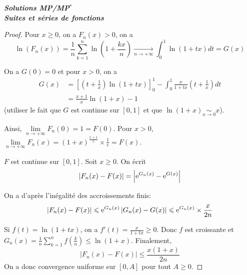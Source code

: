 \documentclass[12pt]{article}
\begin{document}
\begin{titlepage}
	\centering
	\vspace*{\fill}
	\Huge \textit{\textbf{Solutions MP/MP$^*$\\ Suites et séries de fonctions}}
	\vspace*{\fill}
\end{titlepage}

\begin{proof}
    Pour $x\geqslant0$, on a $F_{n}(x)>0$, on a 
    \begin{equation}
        \ln\left(F_{n}(x)\right)=\frac{1}{n}\sum_{k=1}^{n}\ln\left(1+\frac{kx}{n}\right)\xrightarrow[n\to+\infty]{}\int_{0}^{1}\ln\left(1+tx\right)dt=G(x)
    \end{equation}

    On a $G(0)=0$ et pour $x>0$, on a
    \begin{align}
        G(x)
        &= \left[\left(t+\frac{1}{x}\right)\ln(1+tx)\right]_{0}^{1}-\int_{0}^{1}\frac{x}{1+tx}\left(t+\frac{1}{x}\right)dt\\
        &=\frac{x+1}{x}\ln(1+x)-1
    \end{align}
    (utiliser le fait que $G$ est continue sur $[0,1]$ et que $\ln(1+x)\underset{x\to0}{\sim}x$).

    Ainsi, $\lim\limits_{n\to+\infty}F_{n}(0)=1=F(0)$.
    Pour $x>0$, $\lim\limits_{n\to+\infty}F_{n}(x)=\left(1+x\right)^{\frac{x+1}{x}}\times\frac{1}{e}=F(x)$.

    $F$ est continue sur $[0,1]$. Soit $x\geqslant0$. On écrit 
    \begin{equation}
        \left\lvert F_{n}(x)-F(x)\right\rvert=\left\lvert\mathrm{e}^{G_{n}(x)}-\mathrm{e}^{G(x)}\right\rvert
    \end{equation}

    
    On a d'après l'inégalité des accroissements finis: 
    \begin{equation}
        \left\lvert F_{n}(x)-F(x)\right\rvert\leqslant\mathrm{e}^{G_{n}(x)}\left\lvert G_{n}(x)-G(x)\right\rvert\leqslant\mathrm{e}^{G_{n}(x)}\times\frac{x}{2n}
    \end{equation}
    
    Si $f(t)=\ln\left(1+tx\right)$, on a $f'(t)=\frac{x}{1+tx}\geqslant0$. Donc $f$ est croissante et $G_{n}(x)=\frac{1}{n}\sum_{k=1}^{n}f\left(\frac{k}{n}\right)\leqslant\ln(1+x)$. Finalement, 
    \begin{equation}
        \left\lvert F_{n}(x)-F(x)\right\rvert\leqslant\frac{x(1+x)}{2n}
    \end{equation}
    On a donc convergence uniforme sur $[0,A]$ pour tout $A\geqslant0$.
\end{proof}
\end{document}
